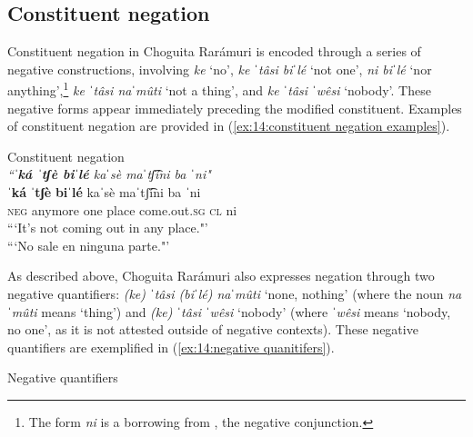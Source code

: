 \z

\subsection{Constituent negation}
\label{subsec: constituent negation}

Constituent negation in Choguita Rarámuri is encoded through a series of negative constructions, involving \textit{ke} `no', \textit{ke ˈtâsi biˈlé} `not one', \textit{ni biˈlé} `nor anything',\footnote{The form \textit{ni} is a borrowing from , the negative conjunction.} \textit{ke ˈtâsi naˈmûti} `not a thing', and \textit{ke ˈtâsi ˈwêsi} `nobody'. These negative forms appear immediately preceding the modified constituent. Examples of constituent negation are provided in (\ref{ex:14:constituent negation examples}).

\ea\label{ex:14:constituent negation examples}
{Constituent negation}\\

        {\textit{``\textbf{ˈká ˈtʃè biˈlé} kaˈsè maˈtʃ͡íni ba ˈni"}}\\
        \gll    \textbf{ˈká} \textbf{ˈtʃè} \textbf{biˈlé} kaˈsè maˈtʃ͡íni ba ˈni\\
                {\textsc{neg}} {anymore} {one} place come.out.\textsc{sg} \textsc{cl} ni\\
        \glt    ```It's not coming out in any place."'\\
        \glt    ```No sale en ninguna parte."' \\

\z

As described above, Choguita Rarámuri also expresses negation through two negative quantifiers: \textit{(ke) ˈtâsi (biˈlé) naˈmûti} `none, nothing' (where the noun \textit{naˈmûti} means `thing') and \textit{(ke) ˈtâsi ˈwêsi} `nobody' (where \textit{ˈwêsi} means `nobody, no one', as it is not attested outside of negative contexts). These negative quantifiers are exemplified in (\ref{ex:14:negative quanitifers}).

\ea\label{ex:14:negative quanitifers}
{Negative quantifiers}\\

